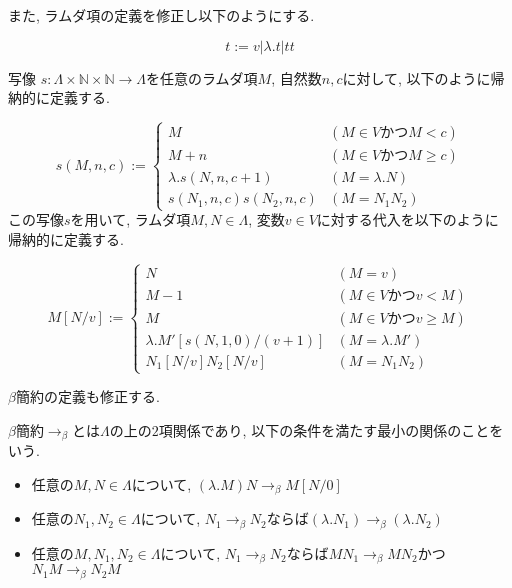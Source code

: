 \documentclass[12pt]{ltjsarticle}
\begin{document}
また, ラムダ項の定義を修正し以下のようにする.

\begin{defn}
 \[
 t := v | \lambda. t | t t
 \]
\end{defn}

\begin{defn}
 写像 $s \colon \Lambda \times \mathbb{N} \times \mathbb{N} \rightarrow \Lambda$を任意のラムダ項$M$, 自然数$n, c$に対して, 以下のように帰納的に定義する.
 
\[
  s (M, n, c) := \begin{cases}
    M & (M \in V \text{かつ} M < c) \\
    M + n & (M \in V \text{かつ} M \geq c) \\
    \lambda. s (N, n, c + 1) & (M = \lambda. N) \\
    s (N_1, n, c) s (N_2, n, c) & (M = N_1 N_2)
  \end{cases}
\]
 この写像$s$を用いて, ラムダ項$M, N \in \Lambda$, 変数$v \in V$に対する代入を以下のように帰納的に定義する.
 
\[
 M[N/v] := \begin{cases}
    N & (M = v) \\
    M - 1 & (M \in V \text{かつ} v < M) \\
    M & (M \in V \text{かつ} v \geq M) \\
    \lambda. M' [s (N, 1, 0)/(v + 1)] & (M = \lambda. M') \\
    N_1[N/v] N_2[N/v] & (M = N_1 N_2)
  \end{cases}
\]
\end{defn}

$\beta$簡約の定義も修正する.

\begin{defn}
 $\beta$簡約$\rightarrow_{\beta}$とは$\Lambda$の上の$2$項関係であり, 以下の条件を満たす最小の関係のことをいう.
 \begin{itemize}
  \item 任意の$M, N \in \Lambda$について, $(\lambda. M) N \rightarrow_\beta M[N/0]$
  \item 任意の$N_1, N_2 \in \Lambda$について, $N_1 \rightarrow_\beta N_2$ならば$(\lambda. N_1) \rightarrow_\beta (\lambda. N_2)$
  \item 任意の$M, N_1, N_2 \in \Lambda$について, $N_1 \rightarrow_\beta N_2$ならば$M N_1 \rightarrow_\beta M N_2$かつ$N_1 M \rightarrow_\beta N_2 M$
 \end{itemize}
\end{defn}
\end{document}

